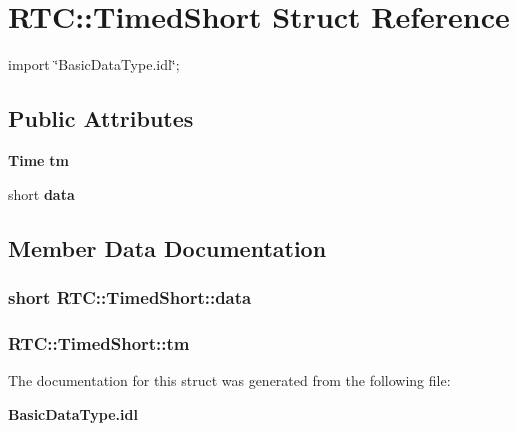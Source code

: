 \section{RTC::TimedShort Struct Reference}
\label{structRTC_1_1TimedShort}


{\ttfamily import \char`\"{}BasicDataType.idl\char`\"{};}

\subsection*{Public Attributes}
\begin{DoxyCompactItemize}
\item 
{\bf Time} {\bf tm}
\item 
short {\bf data}
\end{DoxyCompactItemize}


\subsection{Member Data Documentation}
\subsubsection[{data}]{\setlength{\rightskip}{0pt plus 5cm}short {\bf RTC::TimedShort::data}}\label{structRTC_1_1TimedShort_ad8cbbe0261f33a05776440aec8d4a1b0}
\subsubsection[{tm}]{ {\bf RTC::TimedShort::tm}}\label{structRTC_1_1TimedShort_ad12428d96d25bedebdc9d710759bbc9e}


The documentation for this struct was generated from the following file:\begin{DoxyCompactItemize}
\item 
{\bf BasicDataType.idl}\end{DoxyCompactItemize}
